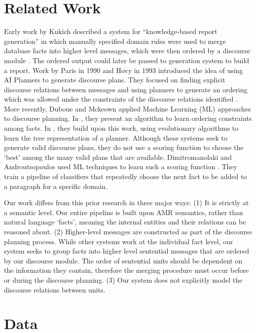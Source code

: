 \documentclass[12pt]{article}
\begin{document}
\section{Related Work}

Early work by Kukich described a system for ``knowledge-based report generation'' in which manually specified domain rules were used to merge database facts into higher level messages, which were then ordered by a discourse module \cite{kukich1983knowledge}. The ordered output could later be passed to generation system to build a report. Work by Paris in 1990 and Hovy in 1993 introduced the idea of using AI Planners to generate discourse plans. They focused on finding explicit discourse relations between messages and using planners to generate an ordering which was allowed under the constraints of the discourse relations identified \cite{paris1990natural}\cite{hovy1993automated}. More recently, Duboue and Mckeown applied Machine Learning (ML) approaches to discourse planning. In \cite{duboue2001empirically}, they present an algorithm to learn ordering constraints among facts. In \cite{duboue2002content}, they build upon this work, using evolutionary algorithms to learn the tree representation of a planner. Although these systems seek to generate valid discourse plans, they do not use a scoring function to choose the `best' among the many valid plans that are available. Dimitromanolaki and Androutsopoulos used ML techniques to learn such a scoring function \cite{learning_to_order_facts}. They train a pipeline of classifiers that repeatedly choose the next fact to be added to a paragraph for a specific domain.

Our work differs from this prior research in three major ways: (1) It is strictly at a semantic level. Our entire pipeline is built upon AMR semantics, rather than natural language `facts', meaning the internal entities and their relations can be reasoned about. (2) Higher-level messages are constructed as part of the discourse planning process. While other systems work at the individual fact level, our system seeks to group facts into higher level sentential messages that are ordered by our discourse module. The order of sentential units should be dependent on the information they contain, therefore the merging procedure must occur before or during the discourse planning. (3) Our system does not explicitly model the discourse relations between units.

\section{Data}
\end{document}
